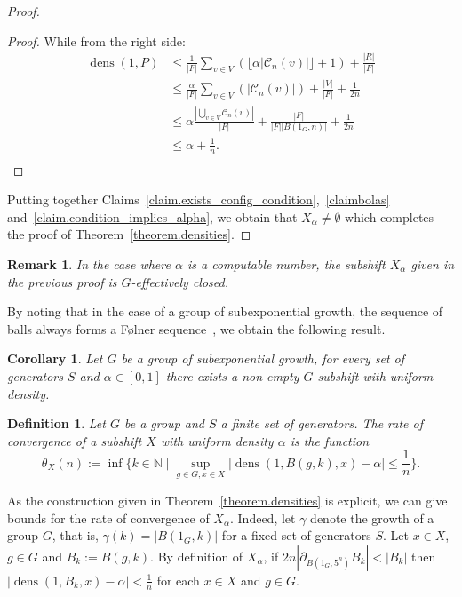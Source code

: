 \documentclass[letterpaper]{article}
\theoremstyle{plain}
\newtheorem{definition}{Definition}[section]
\newtheorem{corollary}[theorem]{Corollary}
\newtheorem*{remark*}{Remark}
\def\NN{\mathbb{N}}
\def\CC{\mathcal{C}}
\def\dens{\operatorname{dens}}
\begin{document}
\begin{proof}
\begin{proof}
			While from the right side:
			\begin{align*}
				\dens(1,P)&   \leq \frac{1}{|F|}\sum_{v \in V}(\lfloor \alpha|\CC_{n}(v)| \rfloor +1) + \frac{|R|}{|F|} \\
				& \leq \frac{\alpha}{|F|}\sum_{v \in V}(|\CC_{n}(v)|)+ \frac{|V|}{|F|} + \frac{1}{2n} \\
				& \leq \alpha\frac{|\bigcup_{v \in V}\CC_{n}(v)|}{|F|}+ \frac{|F|}{|F||B(1_G,n)|} + \frac{1}{2n} \\
				& \leq \alpha + \frac{1}{n}. \\
			\end{align*}\end{proof}	
		Putting together Claims~\ref{claim.exists_config_condition},~\ref{claimbolas} and~\ref{claim.condition_implies_alpha}, we obtain that $X_\alpha\neq\emptyset$ which completes the proof of Theorem~\ref{theorem.densities}. \end{proof}
	
	\begin{remark*}
	In the case where $\alpha$ is a computable number, the subshift $X_{\alpha}$ given in the previous proof is $G$-effectively closed.
	\end{remark*}
	
	By noting that in the case of a group of subexponential growth, the sequence of balls always forms a F\o lner sequence~\cite[Theorem~6.11.2]{ceccherini-SilbersteinC09}, we obtain the following result.
	
	\begin{corollary}\label{corollary subexponential}
		Let $G$ be a group of subexponential growth, for every set of generators $S$ and $\alpha \in [0,1]$ there exists a non-empty $G$-subshift with uniform density.
	\end{corollary}


	\begin{definition}
		Let $G$ be a group and $S$ a finite set of generators. The rate of convergence of a subshift $X$ with uniform density $\alpha$ is the function $$\theta_X(n) := \inf\{ k \in \NN \mid \sup_{g \in G, x \in X} |\dens(1,B(g,k),x)-\alpha| \leq \frac{1}{n}  \}.$$
	\end{definition}
	
	As the construction given in Theorem~\ref{theorem.densities} is explicit, we can give bounds for the rate of convergence of $X_{\alpha}$. Indeed, let $\gamma$ denote the growth of a group $G$, that is, $\gamma(k) = |B(1_G,k)|$ for a fixed set of generators $S$. Let $x \in X$, $g \in G$ and $B_k := B(g,k)$. By definition of $X_{\alpha}$, if $2n|\partial_{B(1_G,5^n)}B_k| < |B_k|$ then  $|\dens(1,B_k,x)-\alpha|<\frac{1}{n}$ for each $x \in X$ and $g \in G$.
	
\end{document}
